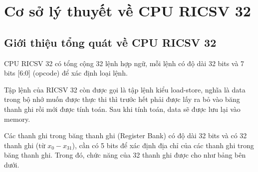 \documentclass[E:/Latex/ExtraWork/ComputerArchitechture/Report.tex]{subfiles}
\begin{document}
	\setcounter{page}{1}
		\chapter{Cơ sở lý thuyết về CPU RICSV 32}
			\section{Giới thiệu tổng quát về CPU RICSV 32}

	CPU RICSV 32 có tổng cộng 32 lệnh hợp ngữ, mỗi lệnh có độ dài 32 bits và 7 bits [6:0] (opcode) để xác định loại lệnh.	
		
						
	Tập lệnh của RICSV 32 còn được gọi là tập lệnh kiểu load-store, nghĩa là data trong bộ nhớ muốn được thực thi thì trước hết phải được lấy ra bỏ vào băng thanh ghi rồi mới được tính toán. Sau khi tính toán, data sẽ được lưu lại vào memory.	
							
	Các thanh ghi trong băng thanh ghi (Register Bank) có độ dài 32 bits và có 32 thanh ghi (từ $x_0 - x_{31}$), cần có 5 bits để xác định địa chỉ của các thanh ghi trong băng thanh ghi. Trong đó, chức năng của 32 thanh ghi được cho như bảng bên dưới.  	
\end{document}
